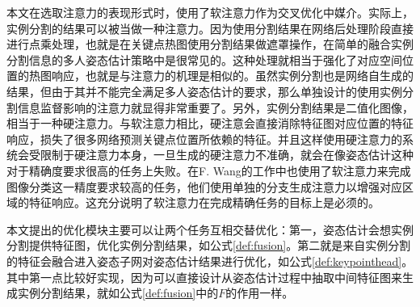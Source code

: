本文在选取注意力的表现形式时，使用了软注意力作为交叉优化中媒介。实际上，实例分割的结果可以被当做一种注意力。因为使用分割结果在网络后处理阶段直接进行点乘处理，也就是在关键点热图使用分割结果做遮罩操作，在简单的融合实例分割信息的多人姿态估计策略中是很常见的。这种处理就相当于强化了对应空间位置的热图响应，也就是与注意力的机理是相似的。虽然实例分割也是网络自生成的结果，但由于其并不能完全满足多人姿态估计的要求，那么单独设计的使用实例分割信息监督影响的注意力就显得非常重要了。另外，实例分割结果是二值化图像，相当于一种硬注意力。与软注意力相比，硬注意会直接消除特征图对应位置的特征响应，损失了很多网络预测关键点位置所依赖的特征。并且这样使用硬注意力的系统会受限制于硬注意力本身，一旦生成的硬注意力不准确，就会在像姿态估计这种对于精确度要求很高的任务上失败。在F. Wang的工作\cite{wang2017residual}中也使用了软注意力来完成图像分类这一精度要求较高的任务，他们使用单独的分支生成注意力以增强对应区域的特征响应。这充分说明了软注意力在完成精确任务的目标上是必须的。

本文提出的优化模块主要可以让两个任务互相交替优化：第一，姿态估计会想实例分割提供特征图，优化实例分割结果，如公式\eqref{def:fusion}。第二就是来自实例分割的特征会融合进入姿态子网对姿态估计结果进行优化，如公式\eqref{def:keypointhead}。其中第一点比较好实现，因为可以直接设计从姿态估计过程中抽取中间特征图来生成实例分割结果，就如公式\eqref{def:fusion}中的$F$的作用一样。

